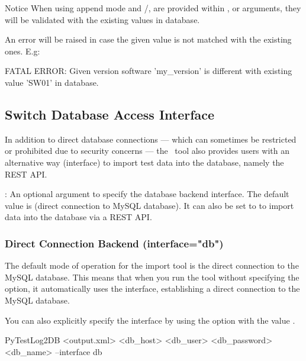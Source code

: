     \begin{boxhint} {Notice}
      When using append mode and /,
       are provided within ,
       or  arguments, they will
      be validated with the existing values in database.

      An error will be raised in case the given value is not matched with the
      existing ones. E.g:
\begin{robotlog}
FATAL ERROR: Given version software 'my_version' is different with existing value 'SW01' in database.
\end{robotlog}
    \end{boxhint}

  \subsection{Switch Database Access Interface}\label{switch-database-access-interface}
  In addition to direct database connections — which can sometimes be restricted 
  or prohibited due to security concerns — the \pkg\ tool also provides users 
  with an alternative way (interface) to import test data into the database, 
  namely the REST API.

  : An optional argument to specify the database backend interface. 
  The default value is  (direct connection to MySQL database). 
  It can also be set to  to import data into the database via a REST API.

    \subsubsection{Direct Connection Backend (interface="db")}
    The default mode of operation for the import tool is the direct connection to the MySQL database. 
    This means that when you run the tool without specifying the  option, 
    it automatically uses the  interface, establishing a direct connection to the MySQL database.

    You can also explicitly specify the  interface by using the  
    option with the value . 

\begin{robotlog}
  PyTestLog2DB <output.xml> <db\_host> <db\_user> <db\_password> <db\_name> --interface db
\end{robotlog}

